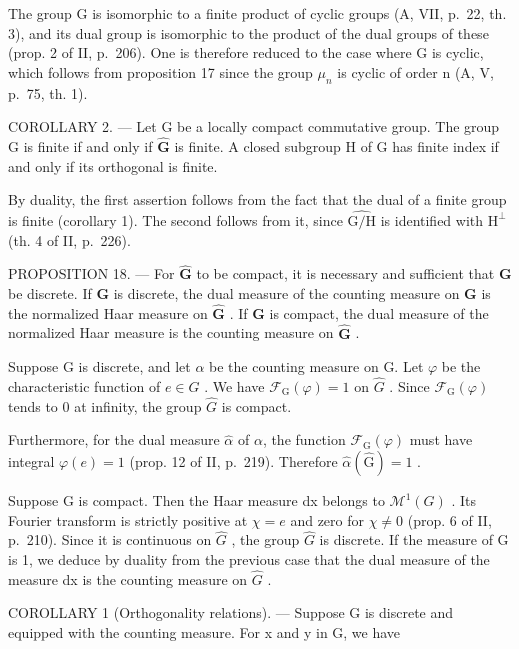 The group G is isomorphic to a finite product of cyclic groups (A, VII, p.~22, th. 3), and its dual group is isomorphic to the product of the dual groups of these (prop. 2 of II, p.~206). One is therefore reduced to the case where G is cyclic, which follows from proposition 17 since the group \(\mu_{n}\) is cyclic of order n (A, V, p.~75, th. 1).

COROLLARY 2. --- Let G be a locally compact commutative group. The group G is finite if and only if \(\widehat{\mathbf{G}}\) is finite. A closed subgroup H of G has finite index if and only if its orthogonal is finite.

By duality, the first assertion follows from the fact that the dual of a finite group is finite (corollary 1). The second follows from it, since \(\widehat{\mathrm{G / H}}\) is identified with \(\mathrm{H}^{\perp}\) (th. 4 of II, p.~226).

PROPOSITION 18. --- For \(\widehat{\mathbf{G}}\) to be compact, it is necessary and sufficient that \(\mathbf{G}\) be discrete. If \(\mathbf{G}\) is discrete, the dual measure of the counting measure on \(\mathbf{G}\) is the normalized Haar measure on \(\widehat{\mathbf{G}}\) . If \(\mathbf{G}\) is compact, the dual measure of the normalized Haar measure is the counting measure on \(\widehat{\mathbf{G}}\) .

Suppose G is discrete, and let \(\alpha\) be the counting measure on G. Let \(\varphi\) be the characteristic function of \(e \in G\) . We have \(\mathcal{F}_{\mathrm{G}}(\varphi) = 1\) on \(\widehat{G}\) . Since \(\mathcal{F}_{\mathrm{G}}(\varphi)\) tends to 0 at infinity, the group \(\widehat{G}\) is compact.

Furthermore, for the dual measure \(\widehat{\alpha}\) of \(\alpha\), the function \(\mathcal{F}_{\mathrm{G}}(\varphi)\) must have integral \(\varphi(e)=1\) (prop. 12 of II, p.~219). Therefore \(\widehat{\alpha}(\widehat{\mathrm{G}})=1\) .

Suppose G is compact. Then the Haar measure dx belongs to \(\mathcal{M}^{1}(G)\) . Its Fourier transform is strictly positive at \(\chi = e\) and zero for \(\chi \neq 0\) (prop. 6 of II, p.~210). Since it is continuous on \(\widehat{G}\) , the group \(\widehat{G}\) is discrete. If the measure of G is 1, we deduce by duality from the previous case that the dual measure of the measure dx is the counting measure on \(\widehat{G}\) .

COROLLARY 1 (Orthogonality relations). --- Suppose G is discrete and equipped with the counting measure. For x and y in G, we have

